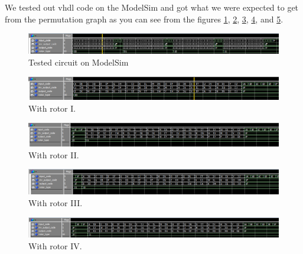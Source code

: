 \documentclass[10pt]{article}
\begin{document}
We tested out vhdl code on the ModelSim and got what we were expected to get from the permutation graph as you can see from the figures \ref{fig:perm_1}, \ref{fig:perm_2}, \ref{fig:perm_3}, \ref{fig:perm_4}, and \ref{fig:perm_5}.
\begin{figure}[!htb]
    \centering
    \includegraphics[width=1\textwidth]{./perm_1.png}
    \caption{Tested circuit on ModelSim}
    \label{fig:perm_1}
\end{figure}
\begin{figure}[!htb]
    \centering
    \includegraphics[width=1\textwidth]{./perm_2.png}
    \caption{With rotor I.}
    \label{fig:perm_2}
\end{figure}
\begin{figure}[!htb]
    \centering
    \includegraphics[width=1\textwidth]{./perm_3.png}
    \caption{With rotor II.}
    \label{fig:perm_3}
\end{figure}
\begin{figure}[!htb]
    \centering
    \includegraphics[width=1\textwidth]{./perm_4.png}
    \caption{With rotor III.}
    \label{fig:perm_4}
\end{figure}
\begin{figure}[!htb]
    \centering
    \includegraphics[width=1\textwidth]{./perm_5.png}
    \caption{With rotor IV.}
    \label{fig:perm_5}
\end{figure}
\end{document}
